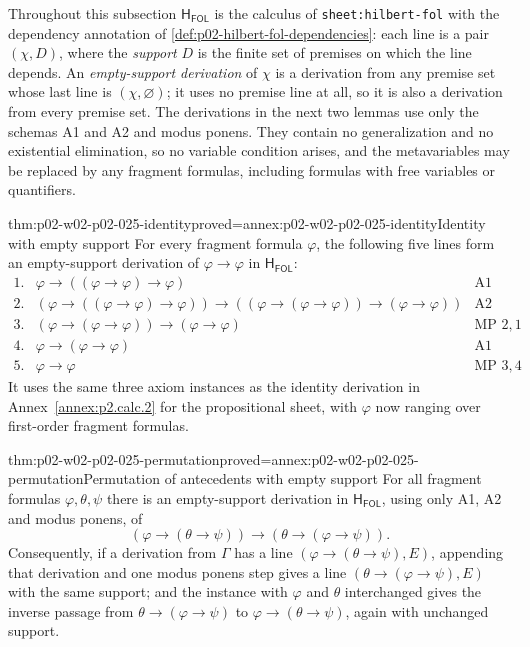 Throughout this subsection \(\mathsf H_{\mathsf{FOL}}\) is the calculus of
\texttt{sheet:\allowbreak hilbert-fol} with the dependency annotation of
\cref{def:p02-hilbert-fol-dependencies}: each line is a pair \((\chi,D)\),
where the \emph{support} \(D\) is the finite set of premises on which the line
depends.  An \emph{empty-support derivation} of \(\chi\) is a derivation from
any premise set whose last line is \((\chi,\varnothing)\); it uses no premise
line at all, so it is also a derivation from every premise set.  The
derivations in the next two lemmas use only the schemas A1 and A2 and modus
ponens.  They contain no generalization and no existential elimination, so no
variable condition arises, and the metavariables may be replaced by any
fragment formulas, including formulas with free variables or quantifiers.

\begin{hblemma}{thm:p02-w02-p02-025-identity}{proved=annex:p02-w02-p02-025-identity}{Identity with empty support}
For every fragment formula \(\varphi\), the following five lines form an
empty-support derivation of \(\varphi\to\varphi\) in
\(\mathsf H_{\mathsf{FOL}}\):
\[
\begin{array}{lll}
 1. & \varphi\to((\varphi\to\varphi)\to\varphi) & \text{A1}\\
 2. & (\varphi\to((\varphi\to\varphi)\to\varphi))\to
      ((\varphi\to(\varphi\to\varphi))\to(\varphi\to\varphi)) & \text{A2}\\
 3. & (\varphi\to(\varphi\to\varphi))\to(\varphi\to\varphi) & \text{MP }2,1\\
 4. & \varphi\to(\varphi\to\varphi) & \text{A1}\\
 5. & \varphi\to\varphi & \text{MP }3,4
\end{array}
\]
It uses the same three axiom instances as the identity derivation in
Annex~\ref{annex:p2.calc.2} for the propositional sheet, with \(\varphi\) now
ranging over first-order fragment formulas.
\end{hblemma}

\begin{hblemma}{thm:p02-w02-p02-025-permutation}{proved=annex:p02-w02-p02-025-permutation}{Permutation of antecedents with empty support}
For all fragment formulas \(\varphi,\theta,\psi\) there is an empty-support
derivation in \(\mathsf H_{\mathsf{FOL}}\), using only A1, A2 and modus
ponens, of
\[
 (\varphi\to(\theta\to\psi))\to(\theta\to(\varphi\to\psi)).
\]
Consequently, if a derivation from \(\Gamma\) has a line
\((\varphi\to(\theta\to\psi),E)\), appending that derivation and one modus
ponens step gives a line \((\theta\to(\varphi\to\psi),E)\) with the same
support; and the instance with \(\varphi\) and \(\theta\) interchanged gives
the inverse passage from \(\theta\to(\varphi\to\psi)\) to
\(\varphi\to(\theta\to\psi)\), again with unchanged support.
\end{hblemma}

